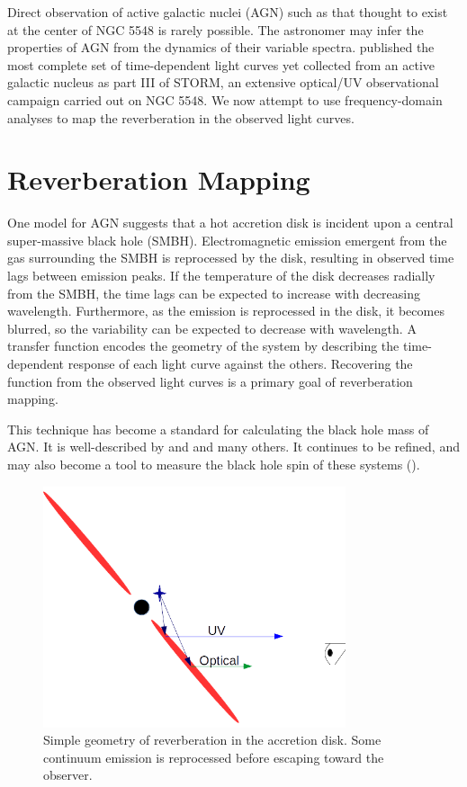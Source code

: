 \documentclass[11pt,letterpaper]{article}
\begin{document}
 Direct observation of active galactic nuclei (AGN) such as that thought to exist at the center of NGC 5548 is rarely possible. The astronomer may infer the properties of AGN from the dynamics of their variable spectra. \cite{2016ApJ...821...56F} published the most complete set of time-dependent light curves yet collected from an active galactic nucleus as part III of STORM, an extensive optical/UV observational campaign carried out on NGC 5548. We now attempt to use frequency-domain analyses to map the reverberation in the observed light curves.

\section{Reverberation Mapping}
	One model for AGN suggests that a hot accretion disk is incident upon a central super-massive black hole (SMBH). Electromagnetic emission emergent from the gas surrounding the SMBH is reprocessed by the disk, resulting in observed time lags between emission peaks. If the temperature of the disk decreases radially from the SMBH, the time lags can be expected to increase with decreasing wavelength. Furthermore, as the emission is reprocessed in the disk, it becomes blurred, so the variability can be expected to decrease with wavelength. A transfer function encodes the geometry of the system by describing the time-dependent response of each light curve against the others. Recovering the function from the observed light curves is a primary goal of reverberation mapping.

	This technique has become a standard for calculating the black hole mass of AGN. It is well-described by \cite{2007MNRAS.380..669C} and \cite{2014A&ARv..22...72U} and many others. It continues to be refined, and may also become a tool to measure the black hole spin of these systems (\cite{2016arXiv160606736K}).

	\begin{figure}
		\centering
		\includegraphics[width=3.5in]{../img/basic_geometry.png}
		\caption{Simple geometry of reverberation in the accretion disk. Some continuum emission is reprocessed before escaping toward the observer.}
	\end{figure}
\end{document}
